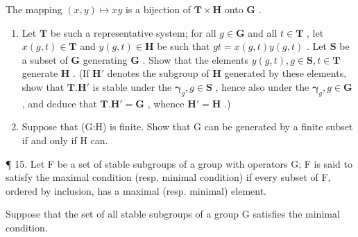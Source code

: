 The mapping \((x,y)\mapsto xy\) is a bijection of \(\mathbf{T}\times \mathbf{H}\) onto \(\mathbf{G}\) .

\begin{enumerate}
\def\labelenumi{(\alph{enumi})}
\item
  Let \(\mathbf{T}\) be such a representative system; for all \(g \in \mathbf{G}\) and all \(t \in \mathbf{T}\) , let \(x(g, t) \in \mathbf{T}\) and \(y(g, t) \in \mathbf{H}\) be such that \(gt = x(g, t)y(g, t)\) . Let \(\mathbf{S}\) be a subset of \(\mathbf{G}\) generating \(\mathbf{G}\) . Show that the elements \(y(g, t), g \in \mathbf{S}, t \in \mathbf{T}\) generate \(\mathbf{H}\) . (If \(\mathbf{H}'\) denotes the subgroup of \(\mathbf{H}\) generated by these elements, show that \(\mathbf{T}.\mathbf{H}'\) is stable under the \(\boldsymbol{\gamma}_g, g \in \mathbf{S}\) , hence also under the \(\boldsymbol{\gamma}_g, g \in \mathbf{G}\) , and deduce that \(\mathbf{T}.\mathbf{H}' = \mathbf{G}\) , whence \(\mathbf{H}' = \mathbf{H}\) .)
\item
  Suppose that (G:H) is finite. Show that G can be generated by a finite subset if and only if H can.
\end{enumerate}

¶ 15. Let F be a set of stable subgroups of a group with operators G; F is said to satisfy the maximal condition (resp. minimal condition) if every subset of F, ordered by inclusion, has a maximal (resp. minimal) element.

Suppose that the set of all stable subgroups of a group G satisfies the minimal condition.

